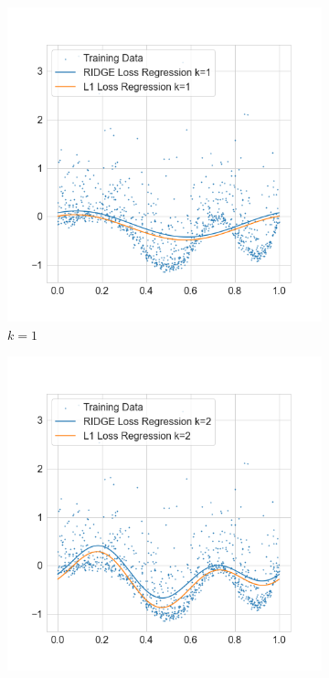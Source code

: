 \documentclass{./tufte-handout}
\begin{document}
\begin{enumerate}[(a)]
\begin{enumerate}
    \begin{figure}[!ht]
        \centering
        \begin{subfigure}[b]{.5\textwidth}
          \centering
          \includegraphics[width=1.2\linewidth]{../figures/l1_vs_ridge_regression_k_1.png}
          \caption{$k=1$}
        \end{subfigure}%
        \hfill
        \begin{subfigure}[b]{.5\textwidth}
          \centering
          \includegraphics[width=1.2\linewidth]{../figures/l1_vs_ridge_regression_k_2.png}

\end{subfigure}
\end{figure}
\end{enumerate}
\end{enumerate}
\end{document}
